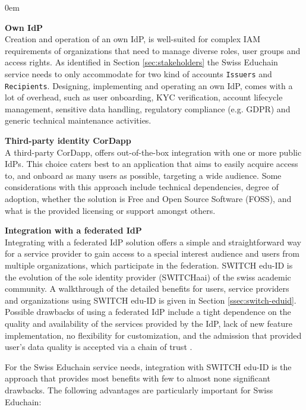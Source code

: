 \begin{description}
	\itemsep0em
	
	\item\textbf{Own IdP} \hfill \\
	Creation and operation of an own IdP, is well-suited for complex IAM requirements of organizations that need to manage diverse roles, user groups and access rights. As identified in Section \ref{sec:stakeholders} the Swiss Educhain service needs to only accommodate for two kind of accounts \texttt{Issuers} and \texttt{Recipients}. Designing, implementing and operating an own IdP, comes with a lot of overhead, such as user onboarding, KYC verification, account lifecycle management, sensitive data handling, regulatory compliance (e.g. GDPR) and generic technical maintenance activities.
	
	\item\textbf{Third-party identity CorDapp} \hfill \\
	A third-party CorDapp, offers out-of-the-box integration with one or more public IdPs. This choice caters best to an application that aims to easily acquire access to, and onboard as many users as possible, targeting a wide audience. Some considerations with this approach include technical dependencies, degree of adoption, whether the solution is Free and Open Source Software (FOSS), and what is the provided licensing or support amongst others.
	
	\item\textbf{Integration with a federated IdP} \hfill \\
	Integrating with a federated IdP solution offers a simple and straightforward way for a service provider to gain access to a special interest audience and users from multiple organizations, which participate in the federation. SWITCH edu-ID is the evolution of the sole identity provider (SWITCHaai) of the swiss academic community. A walkthrough of the detailed benefits for users, service providers and organizations using SWITCH edu-ID is given in Section \ref{ssec:switch-eduid}. Possible drawbacks of using a federated IdP include a tight dependence on the quality and availability of the services provided by the IdP, lack of new feature implementation, no flexibility for customization, and the admission that provided user's data quality is accepted via a chain of trust \cite{saml-duo-guide}. 
\end{description}

For the Swiss Educhain service needs, integration with SWITCH edu-ID is the approach that provides most benefits with few to almost none significant drawbacks. The following advantages are particularly important for Swiss Educhain: 

